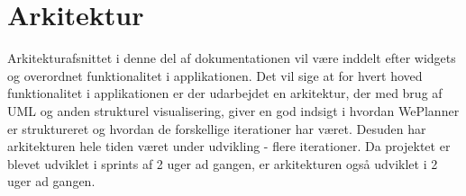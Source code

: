 \chapter{Arkitektur}

Arkitekturafsnittet i denne del af dokumentationen vil være inddelt efter widgets og overordnet funktionalitet i applikationen. Det vil sige at for hvert hoved funktionalitet i applikationen er der udarbejdet en arkitektur, der med brug af UML og anden strukturel visualisering, giver en god indsigt i hvordan WePlanner er struktureret og hvordan de forskellige iterationer har været. Desuden har arkitekturen hele tiden været under udvikling - flere iterationer. Da projektet er blevet udviklet i sprints af 2 uger ad gangen, er arkitekturen også udviklet i 2 uger ad gangen.


